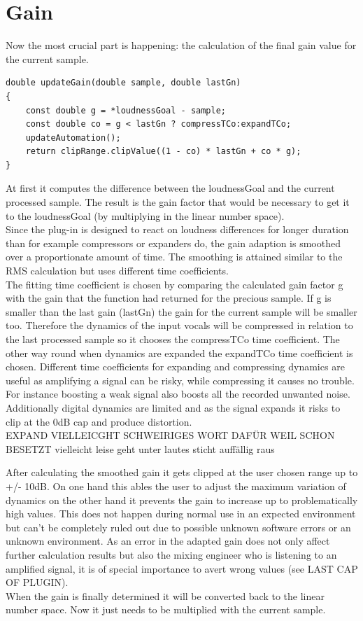 \section{Gain}

Now the most crucial part is happening: the calculation of the final gain value for the current sample.

\begin{lstlisting}[frame=single]
double updateGain(double sample, double lastGn)
{
    const double g = *loudnessGoal - sample;
    const double co = g < lastGn ? compressTCo:expandTCo;
    updateAutomation();
    return clipRange.clipValue((1 - co) * lastGn + co * g);
}
\end{lstlisting}

At first it computes the difference between the loudnessGoal and the current processed sample. The result is the gain factor that would be necessary to get it to the loudnessGoal (by multiplying in the linear number space).\\
Since the plug-in is designed to react on loudness differences for longer duration than for example compressors or expanders do, the gain adaption is smoothed over a proportionate amount of time. The smoothing is attained similar to the RMS calculation but uses different time coefficients.\\
The fitting time coefficient is chosen by comparing the calculated gain factor g with the gain that the function had returned for the precious sample. If g is smaller than the last gain (lastGn) the gain for the current sample will be smaller too. Therefore the dynamics of the input vocals will be compressed in relation to the last processed sample so it chooses the compressTCo time coefficient. The other way round when dynamics are expanded the expandTCo time coefficient is chosen. Different time coefficients for expanding and compressing dynamics are useful as amplifying a signal can be risky, while compressing it causes no trouble. For instance boosting a weak signal also boosts all the recorded unwanted noise. Additionally digital dynamics are limited and as the signal expands it risks to clip at the 0dB cap and produce distortion.\\

EXPAND VIELLEICGHT SCHWEIRIGES WORT DAFÜR WEIL SCHON BESETZT
vielleicht leise geht unter lautes sticht auffällig raus

After calculating the smoothed gain it gets clipped at the user chosen range up to +/- 10dB.
On one hand this ables the user to adjust the maximum variation of dynamics on the other hand it prevents the gain to increase up to problematically high values. This does not happen during normal use in an expected environment but can’t be completely ruled out due to possible unknown software errors or an unknown environment. As an error in the adapted gain does not only affect further calculation results but also the mixing engineer who is listening to an amplified signal, it is of special importance to avert wrong values (see LAST CAP OF PLUGIN).\\
When the gain is finally determined it will be converted back to the linear number space. Now it just needs to be multiplied with the current sample.\\

